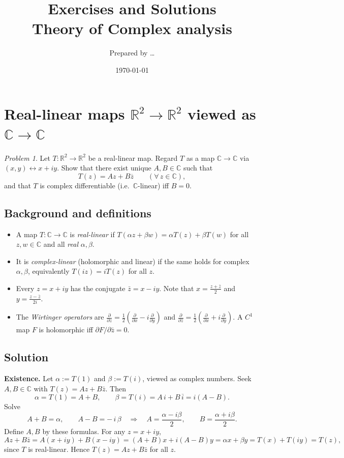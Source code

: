 \documentclass[11pt,a4paper]{article}
\title{Exercises and Solutions \\[0.5em]
	\large Theory of Complex analysis}
\author{Prepared by \dots}
\date{\today}
\theoremstyle{definition}
\theoremstyle{definition}
\theoremstyle{plain}
\theoremstyle{remark}
\newtheorem{problem}{Problem}[section] %
\begin{document}
	\maketitle
	
	
\section*{Real-linear maps $\mathbb{R}^2\!\to\!\mathbb{R}^2$ viewed as $\mathbb{C}\to\mathbb{C}$}

\begin{problem}\label{prob:real-linear-C-decomp}
	Let $T:\mathbb{R}^2\to\mathbb{R}^2$ be a real-linear map. Regard $T$ as a map $\mathbb{C}\to\mathbb{C}$ via $(x,y)\leftrightarrow x+iy$.
	Show that there exist unique $A,B\in\mathbb{C}$ such that
	\[
	T(z)=Az+B\overline{z}\qquad(\forall\,z\in\mathbb{C}),
	\]
	and that $T$ is complex differentiable (i.e.\ $\mathbb{C}$-linear) iff $B=0$.
\end{problem}



\subsection*{Background and definitions}
\begin{itemize}
	\item A map $T:\mathbb{C}\to\mathbb{C}$ is \emph{real-linear} if
	$T(\alpha z+\beta w)=\alpha T(z)+\beta T(w)$ for all $z,w\in\mathbb{C}$ and all \emph{real} $\alpha,\beta$.
	\item It is \emph{complex-linear} (holomorphic and linear) if the same holds for complex $\alpha,\beta$, equivalently $T(iz)=iT(z)$ for all $z$.
	\item Every $z=x+iy$ has the conjugate $\bar z=x-iy$. Note that $x=\frac{z+\bar z}{2}$ and $y=\frac{z-\bar z}{2i}$.
	\item The \emph{Wirtinger operators} are
	$\displaystyle \frac{\partial}{\partial z}=\frac12\!\left(\frac{\partial}{\partial x}-i\frac{\partial}{\partial y}\right)$ and
	$\displaystyle \frac{\partial}{\partial \bar z}=\frac12\!\left(\frac{\partial}{\partial x}+i\frac{\partial}{\partial y}\right)$.
	A $C^1$ map $F$ is holomorphic iff $\partial F/\partial\bar z=0$.
\end{itemize}

\subsection*{Solution}
\textbf{Existence.}
Let $\alpha:=T(1)$ and $\beta:=T(i)$, viewed as complex numbers.
Seek $A,B\in\mathbb{C}$ with $T(z)=Az+B\bar z$. Then
\[
\alpha=T(1)=A+B,\qquad \beta=T(i)=A\,i+B\,\overline{i}=i(A-B).
\]
Solve
\[
A+B=\alpha,\qquad A-B=-\,i\,\beta
\quad\Longrightarrow\quad
A=\frac{\alpha-i\beta}{2},\qquad B=\frac{\alpha+i\beta}{2}.
\]
Define $A,B$ by these formulas. For any $z=x+iy$,
\[
Az+B\bar z
= A(x+iy)+B(x-iy)
= (A+B)x + i(A-B)y
= \alpha x + \beta y
= T(x)+T(iy)=T(z),
\]
since $T$ is real-linear. Hence $T(z)=Az+B\bar z$ for all $z$.
\end{document}
